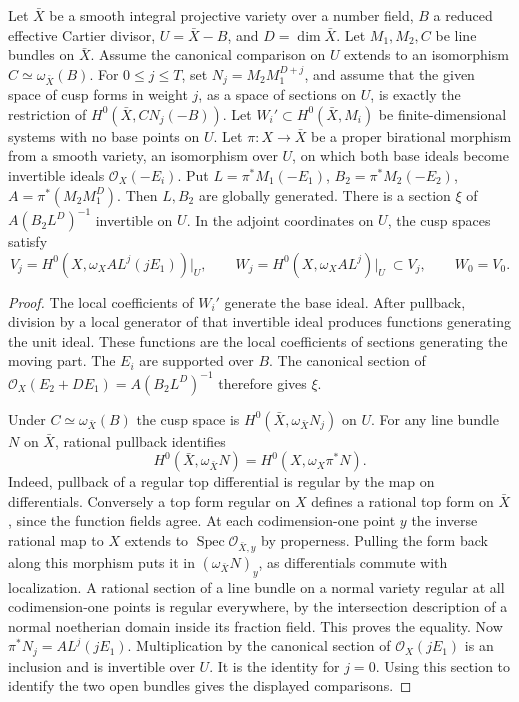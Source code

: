 \begin{proposition}\label{newtheta:modified}
Let \(\bar X\) be a smooth integral projective variety over a number
field, \(B\) a reduced effective Cartier divisor, \(U=\bar X-B\),
and \(D=\dim\bar X\). Let \(M_1,M_2,C\) be line bundles on \(\bar X\).
Assume the canonical comparison on \(U\) extends to an isomorphism
\(C\simeq\omega_{\bar X}(B)\). For \(0\le j\le T\), set
\(N_j=M_2 M_1^{D+j}\), and assume that the given space of cusp forms
in weight \(j\), as a space of sections on \(U\), is exactly the
restriction of \(H^0(\bar X,CN_j(-B))\).
Let \(W_i'\subset H^0(\bar X,M_i)\) be finite-dimensional systems
with no base points on \(U\). Let \(\pi:X\to\bar X\) be a proper
birational morphism from a smooth variety, an isomorphism over \(U\),
on which both base ideals become invertible ideals
\(\mathcal O_X(-E_i)\). Put \(L=\pi^*M_1(-E_1)\),
\(B_2=\pi^*M_2(-E_2)\), \(A=\pi^*(M_2M_1^D)\).
Then \(L,B_2\) are globally generated. There is a section
\(\xi\) of \(A(B_2L^D)^{-1}\) invertible on \(U\).
In the adjoint coordinates on \(U\), the cusp spaces satisfy
\[
 V_j=H^0(X,\omega_X A L^j(jE_1))\big|_U,\qquad
 W_j=H^0(X,\omega_X A L^j)\big|_U\ \subset V_j,\qquad W_0=V_0 .
\]
\end{proposition}
\begin{proof}
The local coefficients of \(W_i'\) generate the base ideal.
After pullback, division by a local generator of that invertible
ideal produces functions generating the unit ideal. These functions
are the local coefficients of sections generating the moving part.
The \(E_i\) are supported over \(B\). The canonical section of
\(\mathcal O_X(E_2+DE_1)=A(B_2L^D)^{-1}\) therefore gives \(\xi\).

Under \(C\simeq\omega_{\bar X}(B)\) the cusp space is
\(H^0(\bar X,\omega_{\bar X}N_j)\) on \(U\). For any line bundle \(N\)
on \(\bar X\), rational pullback identifies
\[
 H^0(\bar X,\omega_{\bar X}N)=H^0(X,\omega_X\pi^*N).
\]
Indeed, pullback of a regular top differential is regular by the
map on differentials. Conversely a top form regular on \(X\) defines
a rational top form on \(\bar X\), since the function fields agree.
At each codimension-one point \(y\) the inverse rational map to \(X\)
extends to \(\operatorname{Spec}\mathcal O_{\bar X,y}\) by properness.
Pulling the form back along this morphism puts it in
\((\omega_{\bar X}N)_y\), as differentials commute with localization.
A rational section of a line bundle on a normal variety regular at
all codimension-one points is regular everywhere, by the intersection
description of a normal noetherian domain inside its fraction field.
This proves the equality. Now \(\pi^*N_j=A L^j(jE_1)\).
Multiplication by the canonical section of \(\mathcal O_X(jE_1)\)
is an inclusion and is invertible over \(U\). It is the identity for
\(j=0\). Using this section to identify the two open bundles gives
the displayed comparisons.
\end{proof}

